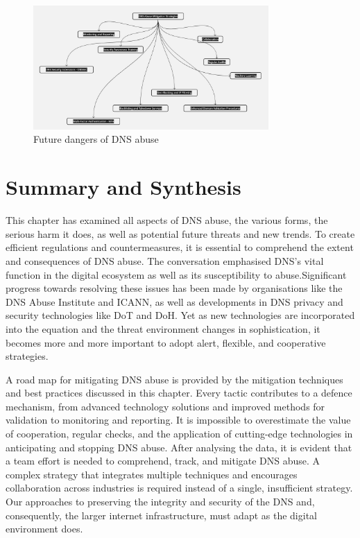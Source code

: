 \begin{figure}[ht]
\centering
\includegraphics[width=0.8\textwidth]{background/DNSabuseMiti.jpg}
\caption{Future dangers of DNS abuse}
\label{fig:figureSix}
\end{figure}

\section{Summary and Synthesis}

This chapter has examined all aspects of DNS abuse,  the various forms, the serious harm it does, as well as potential future threats and new trends. To create efficient regulations and countermeasures, it is essential to comprehend the extent and consequences of DNS abuse. The conversation emphasised DNS's vital function in the digital ecosystem as well as its susceptibility to abuse.Significant progress towards resolving these issues has been made by organisations like the DNS Abuse Institute and ICANN, as well as developments in DNS privacy and security technologies like DoT and DoH. Yet as new technologies are incorporated into the equation and the threat environment changes in sophistication, it becomes more and more important to adopt alert, flexible, and cooperative strategies.  

A road map for mitigating DNS abuse is provided by the mitigation techniques and best practices discussed in this chapter. Every tactic contributes to a defence mechanism, from advanced technology solutions and improved methods for validation to monitoring and reporting. It is impossible to overestimate the value of cooperation, regular checks, and the application of cutting-edge technologies in anticipating and stopping DNS abuse. After analysing the data, it is evident that a team effort is needed to comprehend, track, and mitigate DNS abuse. A complex strategy that integrates multiple techniques and encourages collaboration across industries is required instead of a single, insufficient strategy. Our approaches to preserving the integrity and security of the DNS and, consequently, the larger internet infrastructure, must adapt as the digital environment does.


